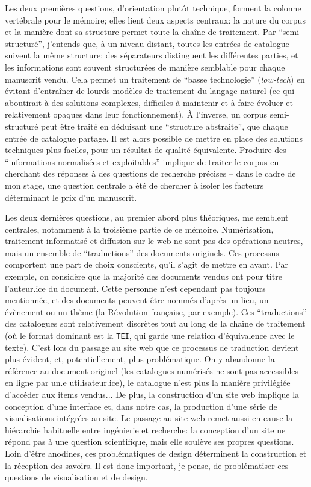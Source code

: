 \documentclass[a4paper, 12pt, twoside]{book}
\newcommand{\tei}{\texttt{TEI}}
\begin{document}
Les deux premières questions, d'orientation plutôt technique, forment la colonne vertébrale pour le mémoire; elles lient deux aspects centraux: la nature du corpus et la manière dont sa structure permet toute la chaîne de traitement. Par \enquote{semi-structuré}, j'entends que, à un niveau distant, toutes les entrées de catalogue suivent la même structure; des séparateurs distinguent les différentes parties, et les informations sont souvent structurées de manière semblable pour chaque manuscrit vendu. Cela permet un traitement de \enquote{basse technologie} (\emph{low-tech}) en évitant d'entraîner de lourds modèles de traitement du langage naturel (ce qui aboutirait à des solutions complexes, difficiles à maintenir et à faire évoluer et relativement opaques dans leur fonctionnement). À l'inverse, un corpus semi-structuré peut être traité en déduisant une \enquote{structure abstraite}, que chaque entrée de catalogue partage. Il est alors possible de mettre en place des solutions techniques plus faciles, pour un résultat de qualité équivalente. Produire des \enquote{informations normalisées et exploitables} implique de traiter le corpus en cherchant des réponses à des questions de recherche précises -- dans le cadre de mon stage, une question centrale a été de chercher à isoler les facteurs déterminant le prix d'un manuscrit.

Les deux dernières questions, au premier abord plus théoriques, me semblent centrales, notamment à la troisième partie de ce mémoire. Numérisation, traitement informatisé et diffusion sur le web ne sont pas des opérations neutres, mais un ensemble de \enquote{traductions} des documents originels. Ces processus comportent une part de choix conscients, qu'il s'agit de mettre en avant. Par exemple, on considère que la majorité des documents vendus ont pour titre l'auteur.ice du document. Cette personne n'est cependant pas toujours mentionnée, et des documents peuvent être nommés d'après un lieu, un évènement ou un thème (la Révolution française, par exemple). Ces \enquote{traductions} des catalogues sont relativement discrètes tout au long de la chaîne de traitement (où le format dominant est la \tei{}, qui garde une relation d'équivalence avec le texte). C'est lors du  passage au site web que ce processus de traduction devient plus évident, et, potentiellement, plus problématique. On y abandonne la référence au document originel (les catalogues numérisés ne sont pas accessibles en ligne par un.e utilisateur.ice), le catalogue n'est plus la manière privilégiée d'accéder aux items vendus... De plus, la construction d'un site web implique la conception d'une interface et, dans notre cas, la production d'une série de visualisations intégrées au site. Le passage au site web remet aussi en cause la hiérarchie habituelle entre ingénierie et recherche: la conception d'un site ne répond pas à une question scientifique, mais elle soulève ses propres questions. Loin d'être anodines, ces problématiques de design déterminent la construction et la réception des savoirs. Il est donc important, je pense, de problématiser ces questions de visualisation et de design.
\end{document}
